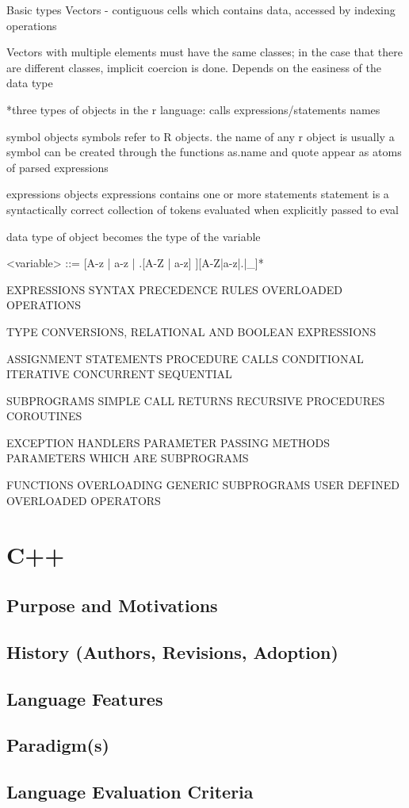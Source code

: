 \documentclass[12pt]{article}
\begin{document}
Basic types
Vectors - contiguous cells which contains data, accessed by indexing operations

Vectors with multiple elements must have the same classes; in the case that there are different classes, implicit coercion is done. Depends on the easiness of the data type

*three types of objects in the r language:
calls
expressions/statements
names

symbol objects
symbols refer to R objects. the name of any r object is usually a symbol
can be created through the functions as.name and quote
appear as atoms of parsed expressions

expressions objects
expressions contains one or more statements
statement is a syntactically correct collection of tokens
evaluated when explicitly passed to eval

data type of object becomes the type of the variable


<variable> ::= [A-z | a-z | .[A-Z | a-z] ][A-Z|a-z|.|_]*



EXPRESSIONS
SYNTAX
PRECEDENCE RULES
OVERLOADED OPERATIONS

TYPE CONVERSIONS, RELATIONAL AND BOOLEAN EXPRESSIONS

ASSIGNMENT STATEMENTS
PROCEDURE CALLS
CONDITIONAL
ITERATIVE
CONCURRENT
SEQUENTIAL

SUBPROGRAMS
SIMPLE CALL RETURNS
RECURSIVE PROCEDURES
COROUTINES

EXCEPTION HANDLERS
PARAMETER PASSING METHODS
PARAMETERS WHICH ARE SUBPROGRAMS

FUNCTIONS OVERLOADING
GENERIC SUBPROGRAMS
USER DEFINED OVERLOADED OPERATORS

\fi


\section{C++}
\subsection{Purpose and Motivations}
\subsection{History (Authors, Revisions, Adoption)}
\subsection{Language Features}
\subsection{Paradigm(s)}
\subsection{Language Evaluation Criteria}
\end{document}
